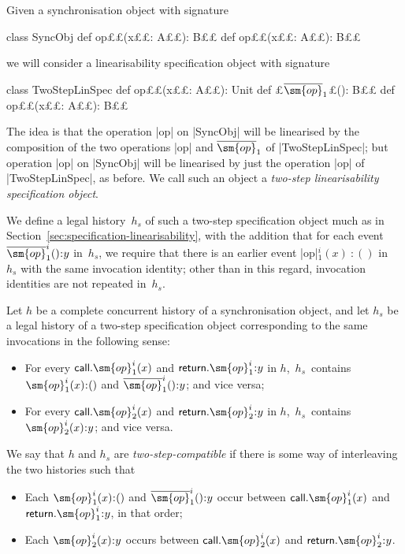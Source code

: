 Given a synchronisation object with signature
\begin{scala}
class SyncObj{
  def op££(x££: A££): B££
  def op££(x££: A££): B££
}
\end{scala}
we will consider a linearisability specification object with signature
%
\begin{scala}
class TwoStepLinSpec{
  def op££(x££: A££): Unit
  def £$\overline{\sm{op}}_1$£(): B££
  def op££(x££: A££): B££
}
\end{scala}
%
The idea is that the operation |op| on |SyncObj| will be linearised by the
composition of the two operations |op| and $\overline{\sm{op}}_1$ of
|TwoStepLinSpec|; but operation |op| on |SyncObj| will be linearised by
just the operation |op| of |TwoStepLinSpec|, as before.  We call such an
object a \emph{two-step linearisability specification object}.

We define a legal history~$h_s$ of such a two-step specification object much
as in Section~\ref{sec:specification-linearisability}, with the addition that
for each event $\overline{\sm{op}}_1^i()\::y$ in~$h_s$, we require that there
is an earlier event |op|$_1^i(x)\::()$ in~$h_s$ with the same invocation
identity; other than in this regard, invocation identities are not repeated
in~$h_s$.

Let $h$ be a complete concurrent history of a synchronisation object, and let
$h_s$ be a legal history of a two-step specification object corresponding to
the same invocations in the following sense:
%
\begin{itemize}
\item For every $\call.\sm{op}_1^i(x)$ and $\return.\sm{op}_1^i\::y$ in $h$,\,
  $h_s$~contains $\sm{op}_1^i(x)\::()$ and $\overline{\sm{op}}_1^i()\::y$; and
  vice versa;

\item For every $\call.\sm{op}_2^i(x)$ and $\return.\sm{op}_2^i\::y$ in $h$,\,
  $h_s$~contains $\sm{op}_2^i(x)\::y$; and vice versa.
\end{itemize}
%
We say that $h$ and $h_s$ are \emph{two-step-compatible} if there is some way of
interleaving the two histories such that 
%
\begin{itemize}
\item Each $\sm{op}_1^i(x)\::()$ and $\overline{\sm{op}}_1^i()\::y$ occur
  between $\call.\sm{op}_1^i(x)$ and $\return.\sm{op}_1^i\::y$, in that
  order; 

\item Each $\sm{op}_2^i(x)\::y$ occurs between $\call.\sm{op}_2^i(x)$ and
  $\return.\sm{op}_2^i\::y$.
\end{itemize}

